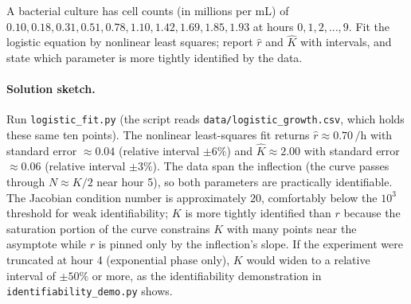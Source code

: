 \begin{exercise}
A bacterial culture has cell counts (in millions per mL) of
$0.10, 0.18, 0.31, 0.51, 0.78, 1.10, 1.42, 1.69, 1.85, 1.93$
at hours $0, 1, 2, \ldots, 9$. Fit the logistic equation by
nonlinear least squares; report $\hat r$ and $\hat K$ with
intervals, and state which parameter is more tightly identified
by the data.

\paragraph{Solution sketch.} Run \texttt{logistic\_fit.py} (the
script reads \texttt{data/logistic\_growth.csv}, which holds these
same ten points). The nonlinear least-squares fit returns
$\hat r \approx 0.70\,\si{\per\hour}$ with standard error
$\approx 0.04$ (relative interval $\pm 6\%$) and
$\hat K \approx 2.00$ with standard error $\approx 0.06$ (relative
interval $\pm 3\%$). The data span the inflection (the curve passes
through $N \approx K/2$ near hour 5), so both parameters are
practically identifiable. The Jacobian condition number is
approximately $20$, comfortably below the $10^{3}$ threshold for
weak identifiability; $K$ is more tightly identified than $r$
because the saturation portion of the curve constrains $K$ with
many points near the asymptote while $r$ is pinned only by the
inflection's slope. If the experiment were truncated at hour 4
(exponential phase only), $K$ would widen to a relative interval
of $\pm 50\%$ or more, as the identifiability demonstration in
\texttt{identifiability\_demo.py} shows.
\end{exercise}

